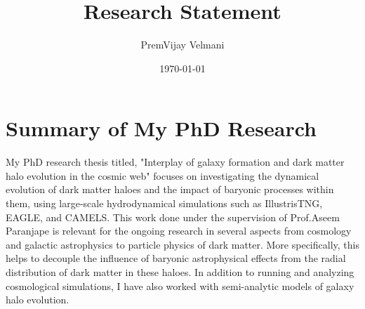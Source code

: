 \documentclass[11pt]{article}
\title{Research Statement}
\author{PremVijay Velmani}
\date{\today}
\begin{document}
\maketitle

\section*{Summary of My PhD Research}

My PhD research thesis titled, "Interplay of galaxy formation and dark matter halo evolution in the cosmic web" focuses on investigating the dynamical evolution of dark matter haloes and the impact of baryonic processes within them, using large-scale hydrodynamical simulations such as IllustrisTNG, EAGLE, and CAMELS. This work done under the supervision of Prof.Aseem Paranjape is relevant for the ongoing research in several aspects from cosmology and galactic astrophysics to particle physics of dark matter. More specifically, this helps to decouple the influence of baryonic astrophysical effects from the radial distribution of dark matter in these haloes. In addition to running and analyzing cosmological simulations, I have also worked with semi-analytic models of galaxy halo evolution.
\end{document}
